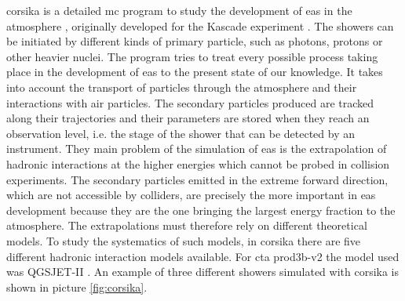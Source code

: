 \documentclass[main.tex]{subfiles}
\begin{document}
\gls{corsika} is a detailed \gls{mc} program to study the development of \gls{eas} in the atmosphere \cite{1998Corsika}, originally developed for the Kascade experiment \cite{1997Kascade}. The showers can be initiated by different kinds of primary particle, such as photons, protons or other heavier nuclei. The program tries to treat every possible process taking place in the development of \gls{eas} to the present state of our knowledge. It takes into account the transport of particles through the atmosphere and their interactions with air particles. The secondary particles produced are tracked along their trajectories and their parameters are stored when they reach an observation level, i.e. the stage of the shower that can be detected by an instrument. They main problem of the simulation of \gls{eas} is the extrapolation of hadronic interactions at the higher energies which cannot be probed in collision experiments. The secondary particles emitted in the extreme forward direction, which are not accessible by colliders, are precisely the more important in \gls{eas} development because they are the one bringing the largest energy fraction to the atmosphere. The extrapolations must therefore rely on different theoretical models. To study the systematics of such models, in \gls{corsika} there are five different hadronic interaction models available. For \gls{cta} prod3b-v2 the model used was QGSJET-II \cite{2006QGSJET}. An example of three different showers simulated with \gls{corsika} is shown in picture \ref{fig:corsika}.
\end{document}
